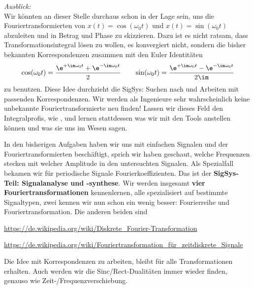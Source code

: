 \begin{mdframed}
\textit{Ausblick:}
%
\\\noindent Wir könnten an dieser Stelle durchaus schon in der Lage sein, uns die
Fouriertransformierten von $x(t) = \cos(\omega_0 t)$ und $x(t) = \sin(\omega_0 t)$
abzuleiten und in Betrag und Phase zu skizzieren.
%
Dazu ist es nicht ratsam, dass Transformationsintegral lösen zu wollen,
es konvergiert nicht, sondern die bisher bekannten Korrespondenzen zusammen
mit den Euler Identitäten
\begin{align}
\cos(\omega_0 t) = \frac{\e^{+\im\omega_0 t}+\e^{-\im\omega_0 t}}{2}\qquad
\sin(\omega_0 t) = \frac{\e^{+\im\omega_0 t}-\e^{-\im\omega_0 t}}{2\im}
\end{align}
zu benutzen.
%
Diese Idee durchzieht die SigSys: Suchen nach und Arbeiten mit passenden
Korrespondenzen. Wir werden als Ingenieure sehr wahrscheinlich keine unbekannte
Fouriertransformierte neu finden! Lassen wir dieses Feld den Integralprofis, wie
\cite{Abramowitz1972}, \cite{Gradshteyn2007} und lernen stattdessen was wir mit den
Tools anstellen können und was sie uns im Wesen sagen.
\end{mdframed}

%
In den bisherigen Aufgaben haben wir uns mit einfachen Signalen und der
Fouriertransformierten beschäftigt, sprich wir haben geschaut, welche Frequenzen
stecken mit welcher Amplitude in den untersuchten Signalen.
%
Als Spezialfall bekamen wir für periodische Signale Fourierkoeffizienten.
%
Das ist der \textbf{SigSys-Teil: Signalanalyse und -synthese}. Wir werden insgesamt
\textbf{vier Fouriertransformationen} kennenlernen, alle spezialisiert auf bestimmte
Signaltypen, zwei kennen wir nun schon ein wenig besser: Fourierreihe und
Fouriertransformation.
Die anderen beiden sind

\url{https://de.wikipedia.org/wiki/Diskrete_Fourier-Transformation}

\url{https://de.wikipedia.org/wiki/Fouriertransformation_für_zeitdiskrete_Signale}

Die Idee mit Korrespondenzen zu arbeiten, bleibt für alle Transformationen
erhalten. Auch werden wir die Sinc/Rect-Dualitäten immer wieder finden,
genauso wie Zeit-/Frequenzverschiebung.




